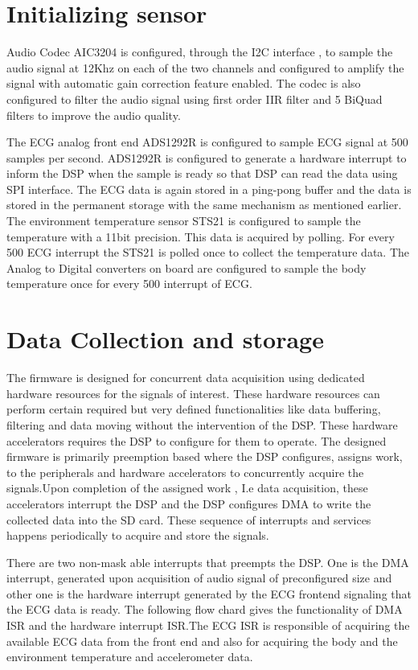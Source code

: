 \section{Initializing sensor}
Audio Codec AIC3204 is configured, through the I2C interface , to sample the audio signal at 12Khz on each of the two channels and configured to amplify the signal with automatic gain correction feature enabled. The codec is also configured to filter the audio signal using first order IIR filter and 5 BiQuad filters to improve the audio quality. 

The ECG analog front end ADS1292R is configured to sample ECG signal at 500 samples per second. ADS1292R is configured to generate a hardware interrupt to inform the DSP when the sample is ready so that DSP can read the data using SPI interface. The ECG data is again stored in a ping-pong buffer and the data is stored in the permanent storage with the same mechanism as mentioned earlier. 
The environment temperature sensor STS21 is configured to sample the temperature with a 11bit precision. This data is acquired by polling. For every 500 ECG interrupt the STS21 is polled once to collect the temperature data.  
The Analog to Digital converters on board are configured to  sample the body temperature once for every 500 interrupt of ECG.

\section{Data Collection and storage}
The firmware is designed for concurrent data acquisition using dedicated hardware resources for the signals of interest. These hardware resources can perform certain required but  very defined functionalities like data buffering, filtering and data moving  without the intervention of the DSP. These hardware accelerators requires the DSP to configure for them to operate. The designed firmware is primarily preemption based where the DSP configures, assigns work, to the peripherals and hardware accelerators to concurrently acquire the signals.Upon completion of the assigned work , I.e data acquisition, these accelerators interrupt the DSP and the DSP configures DMA to write the collected data into the SD card. These sequence of interrupts and services happens periodically to acquire and store the signals.


\hspace{10mm} There are two non-mask able interrupts that preempts the DSP. One is the DMA interrupt, generated upon acquisition of audio signal of preconfigured size  and other one is the hardware interrupt generated by the ECG frontend signaling that the ECG data is ready. The following flow chard gives the functionality of DMA ISR and the hardware interrupt ISR.The ECG ISR is responsible of acquiring the available ECG data from the front end and also for acquiring the body and the environment temperature and accelerometer data.
 
